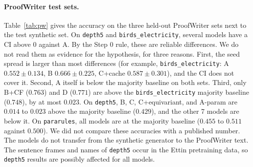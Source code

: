 \documentclass[11pt,a4paper]{article}
\begin{document}
\paragraph{ProofWriter test sets.}
Table~\ref{tab:pw} gives the accuracy on the three held-out ProofWriter sets next to the test synthetic set.
On \texttt{depth5} and \texttt{birds\_electricity}, several models have a CI above 0 against A.
By the Step 0 rule, these are reliable differences.
We do not read them as evidence for the hypothesis, for three reasons.
First, the seed spread is larger than most differences (for example, \texttt{birds\_electricity}: A $0.552 \pm 0.134$, B $0.666 \pm 0.225$, C+cache $0.587 \pm 0.301$), and the CI does not cover it.
Second, A itself is below the majority baseline on both sets.
Third, only B+CF ($0.763$) and D ($0.771$) are above the \texttt{birds\_electricity} majority baseline ($0.748$), by at most $0.023$.
On \texttt{depth5}, B, C, C+equivariant, and A-param are $0.014$ to $0.023$ above the majority baseline ($0.429$), and the other 7 models are below it.
On \texttt{pararules}, all models are at the majority baseline ($0.455$ to $0.511$ against $0.500$).
We did not compare these accuracies with a published number.
The models do not transfer from the synthetic generator to the ProofWriter text.
The sentence frames and names of \texttt{depth5} occur in the Ettin pretraining data, so \texttt{depth5} results are possibly affected for all models.
\end{document}
